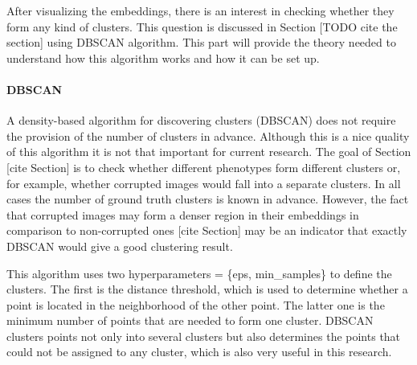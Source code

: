 After visualizing the embeddings, there is an interest in checking whether they form any kind of clusters. This question is discussed in Section [TODO cite the section] using DBSCAN algorithm. This part will provide the theory needed to understand how this algorithm works and how it can be set up.
\paragraph{DBSCAN}
\label{section:dbscan}
A density-based algorithm for discovering clusters (DBSCAN) does not require the provision of the number of clusters in advance. Although this is a nice quality of this algorithm it is not that important for current research. The goal of Section [cite Section] is to check whether different phenotypes form different clusters or, for example, whether corrupted images would fall into a separate clusters. In all cases the number of ground truth clusters is known in advance. However, the fact that corrupted images may form a denser region in their embeddings in comparison to non-corrupted ones [cite Section] may be an indicator that exactly DBSCAN would give a good clustering result. 

This algorithm uses two hyperparameters = \{eps, min\_samples\} to define the clusters. The first is the distance threshold, which is used to determine whether a point is located in the neighborhood of the other point. The latter one is the minimum number of points that are needed to form one cluster. DBSCAN clusters points not only into several clusters but also determines the points that could not be assigned to any cluster, which is also very useful in this research.